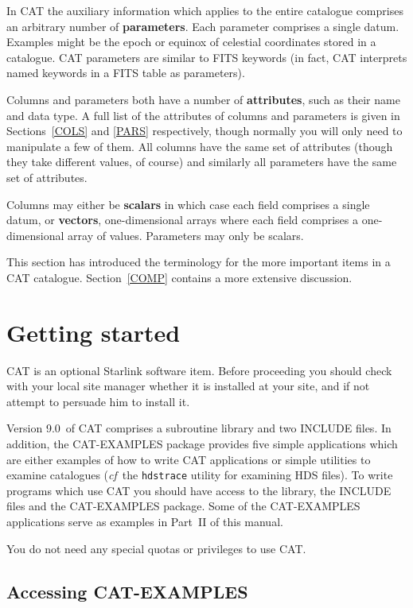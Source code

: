 \documentclass[11pt,twoside]{starlink}
\providecommand{\CATversion}{9.0~}
\begin{document}
In CAT the auxiliary information which applies to the entire catalogue
comprises an arbitrary number of \textbf{parameters}. Each parameter
comprises a single datum. Examples might be the epoch or equinox of
celestial coordinates stored in a catalogue. CAT parameters are
similar to FITS keywords (in fact, CAT interprets named keywords in
a FITS table as parameters).

Columns and parameters both have a number of \textbf{attributes}, such
as their name and data type. A full list of the attributes of
columns and parameters is given in Sections~\ref{COLS} and
\ref{PARS} respectively, though normally you will only need to
manipulate a few of them.  All columns have the same set of attributes
(though they take different values, of course) and similarly all
parameters have the same set of attributes.

Columns may either be \textbf{scalars} in which case each field comprises
a single datum, or \textbf{vectors}, one-dimensional arrays where each
field comprises a one-dimensional array of values. Parameters may only
be scalars.

This section has introduced the terminology for the more important
items in a CAT catalogue. Section~\ref{COMP} contains a more extensive
discussion.


\section{\label{START}Getting started}

CAT is an optional Starlink software item. Before proceeding you should
check with your local site manager whether it is installed at your site,
and if not attempt to persuade him to install it.

Version \CATversion of CAT comprises a subroutine library and two INCLUDE
files.  In addition, the CAT-EXAMPLES package provides five simple
applications which are either examples of how to write CAT applications
or simple utilities to examine catalogues (\textit{cf}\, the \texttt{hdstrace}
utility for examining HDS files). To write programs which use CAT you
should have access to the library, the INCLUDE files and the CAT-EXAMPLES
package.  Some of the CAT-EXAMPLES applications serve as examples in
Part~II of this manual.

You do not need any special quotas or privileges to use CAT.


\subsection{\label{ACCESS}Accessing CAT-EXAMPLES}
\end{document}
